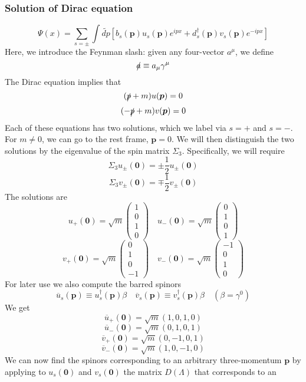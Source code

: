 \subsubsection{Solution of Dirac equation}
\[\Psi(x) = \sum_{s = \pm} \int \widetilde{dp} \left[ b_s(\bm{p})u_s(\bm{p}) e^{ipx} + d^{\dagger}_s(\bm{p})v_s(\bm{p}) e^{-ipx}\right]\]
Here, we introduce the Feynman slash: given any four-vector $a^{\mu}$, we define
\[\slashed{a} \equiv a_{\mu} \gamma^{\mu}\]
The Dirac equation implies that
\[(\slashed{p}+m)u(\bm{p}) = 0\]
\[(-\slashed{p}+m)v(\bm{p}) = 0\]
Each of these equations has two solutions, which we label via $s=+$ and $s=-$. For $m \neq 0$, we can go to the rest frame, $\bm{p} = 0$. We will then distinguish the two solutions by the eigenvalue of the spin matrix $\Sigma_3$. Specifically, we will require
\[\Sigma_3 u_{\pm}(\bm{0}) = \pm \frac{1}{2} u_{\pm}(\bm{0})\]
\[\Sigma_3 v_{\pm}(\bm{0}) = \mp \frac{1}{2} v_{\pm}(\bm{0})\]
The solutions are
\[u_{+}(\bm{0}) = \sqrt{m} \left( \begin{matrix} 1\\ 0\\ 1 \\ 0\end{matrix} \right) \quad u_{-}(\bm{0}) = \sqrt{m} \left( \begin{matrix} 0\\ 1\\ 0 \\ 1\end{matrix} \right) \]
\[v_{+}(\bm{0}) = \sqrt{m} \left( \begin{matrix} 0\\ 1\\ 0 \\ -1\end{matrix} \right) \quad v_{-}(\bm{0}) = \sqrt{m} \left( \begin{matrix} -1\\ 0\\ 1 \\ 0\end{matrix} \right) \]
For later use we also compute the barred spinors
\[\overline{u}_s(\bm{p}) \equiv u^{\dagger}_s(\bm{p})\beta \quad \overline{v}_s(\bm{p}) \equiv v^{\dagger}_s(\bm{p})\beta \quad (\beta = \gamma^0)\]
We get
\[\overline{u}_{+}(\bm{0}) = \sqrt{m} (1,0,1,0)\]
\[\overline{u}_{-}(\bm{0}) = \sqrt{m} (0,1,0,1)\]
\[\overline{v}_{+}(\bm{0}) = \sqrt{m} (0,-1,0,1)\]
\[\overline{v}_{-}(\bm{0}) = \sqrt{m} (1,0,-1,0)\]
We can now find the spinors corresponding to an arbitrary three-momentum $\bm{p}$ by applying to $u_s(\bm{0})$ and $v_s(\bm{0})$ the matrix $D(\Lambda)$ that corresponds to an
